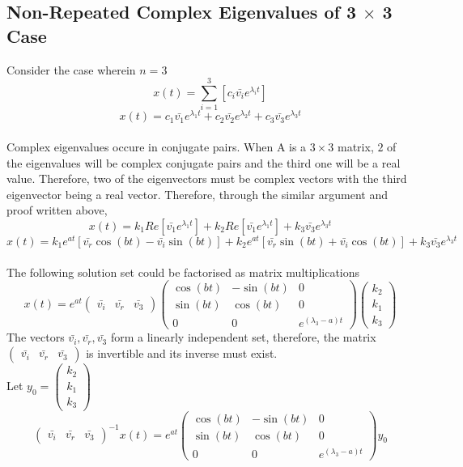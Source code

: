 \documentclass[a4paper, 12pt]{report}
\def\la{\lambda}
\def\l{\left}
\def\r{\right}
\def\dst{\displaystyle}
\def\b{\bar}
\begin{document}
\begin{center}
\subsection{Non-Repeated Complex Eigenvalues of 3 $\times$ 3 Case}
Consider the case wherein $n = 3$
$$x(t) = \sum_{i=1}^{3}\l[c_i\b{v_i}e^{\la_i t}\r]$$
$$x(t) = c_1\b{v_1}e^{\la_1 t} + c_2\b{v_2}e^{\la_2 t} + c_3\b{v_3}e^{\la_3 t}$$
\\Complex eigenvalues occure in conjugate pairs. When A is a $3 \times 3$ matrix, $2$ of the eigenvalues will be complex conjugate pairs and the third one will be a real value. Therefore, two of the eigenvectors must be complex vectors with the third eigenvector being a real vector. Therefore, through the similar argument and proof written above, 
$$x(t) = k_1Re\l[\b{v_1}e^{\la_1 t}\r] + k_2Re\l[\b{v_1}e^{\la_1 t}\r] + k_3\b{v_3}e^{\la_3 t}$$
$$x(t)=k_1e^{at}[\b{v_r}\cos{(bt)} - \b{v_i}\sin{(bt)}] + k_2e^{at}[\b{v_r}\sin{(bt)} + \b{v_i}\cos{(bt)}] + k_3\b{v_3}e^{\la_3 t}$$
\\The following solution set could be factorised as matrix multiplications
$$x(t) = e^{at} \begin{pmatrix} \b{v_i}&\b{v_r} &\b{v_3} \end{pmatrix} \begin{pmatrix}\cos{(bt)} &-\sin{(bt)} &0\\\sin{(bt)}&\cos{(bt)} & 0\\0& 0& e^{(\la_3 - a)t}\end{pmatrix} \begin{pmatrix} k_2 \\k_1 \\ k_3 \end{pmatrix}$$
The vectors $\b{v_i},\b{v_r},\b{v_3}$ form a linearly independent set, therefore, the matrix $\dst{\begin{pmatrix} \b{v_i}&\b{v_r} &\b{v_3} \end{pmatrix}}$ is invertible and its inverse must exist.
\\Let $\dst{y_0 = \begin{pmatrix} k_2\\k_1 \\k_3 \end{pmatrix}}$ 
$$\begin{pmatrix} \b{v_i}&\b{v_r} &\b{v_3} \end{pmatrix} ^{-1 }x(t) = e^{at} \begin{pmatrix}\cos{(bt)} &-\sin{(bt)} &0\\\sin{(bt)}&\cos{(bt)} & 0\\0& 0& e^{(\la_3 - a)t}\end{pmatrix} y_0$$

\end{center}
\end{document}
